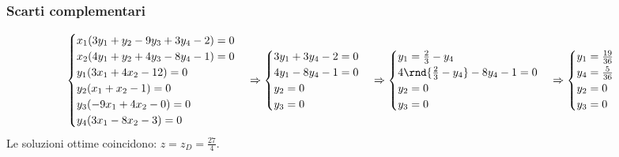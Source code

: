 \documentclass[\main/main.tex]{subfiles}
\begin{document}
\subsubsection*{Scarti complementari}
\[
  \begin{cases}
    x_1(3y_1 + y_2 - 9y_3 +3y_4 -2) = 0 \\
    x_2(4y_1 + y_2 + 4y_3 -8y_4 -1) = 0 \\
    y_1(3x_1 + 4x_2  -12) = 0           \\
    y_2(x_1 + x_2    -1 ) = 0           \\
    y_3(-9x_1 + 4x_2 -0 ) = 0           \\
    y_4(3x_1 - 8x_2  -3 ) = 0           \\
  \end{cases}
  \Rightarrow
  \begin{cases}
    3y_1 +3y_4 -2 = 0 \\
    4y_1 -8y_4 -1 = 0 \\
    y_2 = 0           \\
    y_3 = 0           \\
  \end{cases}
  \Rightarrow
  \begin{cases}
    y_1 = \frac{2}{3} -y_4               \\
    4\rnd{\frac{2}{3} -y_4} -8y_4 -1 = 0 \\
    y_2 = 0                              \\
    y_3 = 0                              \\
  \end{cases}
  \Rightarrow
  \begin{cases}
    y_1 = \frac{19}{36} \\
    y_4 = \frac{5}{36}  \\
    y_2 = 0             \\
    y_3 = 0             \\
  \end{cases}
\]
Le soluzioni ottime coincidono: $z = z_D = \frac{27}{4}$.
\end{document}
